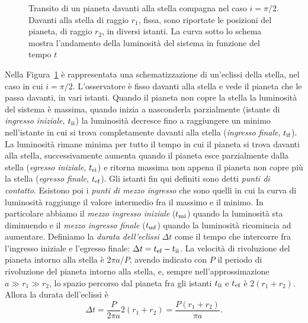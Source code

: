 \begin{figure}
  \centering
  \begin{tikzpicture}[scale=0.6,font=\footnotesize]
    
  \end{tikzpicture}
  \caption[Transito di un pianeta davanti alla stella compagna nel caso
  $i = \pi/2$]{Transito di un pianeta davanti alla stella compagna nel caso $i =
    \pi/2$. Davanti alla stella di raggio $r_1$, fissa, sono riportate le
    posizioni del pianeta, di raggio $r_2$, in diversi istanti. La curva sotto
    lo schema mostra l'andamento della luminosità del sistema in funzione del
    tempo $t$}
  \label{fig:schema-transito}
\end{figure}
Nella Figura~\ref{fig:schema-transito} è rappresentata una schematizzazione di
un'eclissi della stella, nel caso in cui $i = \pi/2$. L'osservatore è fisso
davanti alla stella e vede il pianeta che le passa davanti, in vari
istanti. Quando il pianeta non copre la stella la luminosità del sistema è
massima, quando inizia a nasconderla parzialmente (istante di
\emph{ingresso iniziale}, $t_{\textup{ii}}$) la luminosità decresce fino a
raggiungere un minimo nell'istante in cui si trova completamente davanti alla
stella (\emph{ingresso finale}, $t_{\textup{if}}$). La luminosità rimane minima
per tutto il tempo in cui il pianeta si trova davanti alla stella,
successivamente aumenta quando il pianeta esce parzialmente dalla stella
(\emph{egresso iniziale}, $t_{\textup{ei}}$) e ritorna massima non appena il
pianeta non copre più la stella (\emph{egresso finale}, $t_{\textup{ef}}$). Gli
istanti fin qui definiti sono detti \emph{punti di contatto}. Esistono poi i
\emph{punti di mezzo ingresso} che sono quelli in cui la curva di luminosità
raggiunge il valore intermedio fra il massimo e il minimo. In particolare
abbiamo il \emph{mezzo ingresso iniziale} ($t_{\textup{mi}}$) quando la
luminosità sta diminuendo e il \emph{mezzo ingresso finale} ($t_{\textup{mf}}$)
quando la luminosità ricomincia ad aumentare. Definiamo la
\emph{durata dell'eclissi} $\Delta t$ come il tempo che intercorre fra
l'ingresso iniziale e l'egresso finale:
$\Delta t = t_{\textup{ef}} - t_{\textup{ii}}$. La velocità di rivoluzione del
pianeta intorno alla stella è $2\pi a/P$, avendo indicato con $P$ il periodo
di rivoluzione del pianeta intorno alla stella, e, sempre nell'approssimazione
$a \gg r_1 \gg r_2$, lo spazio percorso dal pianeta fra gli istanti
$t_{\textup{ii}}$ e $t_{\textup{ef}}$ è $2(r_1 + r_2)$. Allora la durata
dell'eclissi è
\begin{equation}
  \Delta t = \frac{P}{2\pi a}2(r_1 + r_2) = \frac{P(r_1 + r_2)}{\pi a}.
\end{equation}

